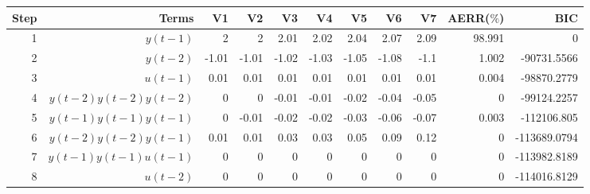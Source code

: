 \begin{tabular}{rrrrrrrrrrr}
Step & Terms & V1 & V2 & V3 & V4 & V5 & V6 & V7 & AERR($\%$) & BIC \\ 
\hline 
1 & $y(t-1)$ & 2 & 2 & 2.01 & 2.02 & 2.04 & 2.07 & 2.09 & 98.991 & 0 \\ 
2 & $y(t-2)$ & -1.01 & -1.01 & -1.02 & -1.03 & -1.05 & -1.08 & -1.1 & 1.002 & -90731.5566 \\ 
3 & $u(t-1)$ & 0.01 & 0.01 & 0.01 & 0.01 & 0.01 & 0.01 & 0.01 & 0.004 & -98870.2779 \\ 
4 & $y(t-2)y(t-2)y(t-2)$ & 0 & 0 & -0.01 & -0.01 & -0.02 & -0.04 & -0.05 & 0 & -99124.2257 \\ 
5 & $y(t-1)y(t-1)y(t-1)$ & 0 & -0.01 & -0.02 & -0.02 & -0.03 & -0.06 & -0.07 & 0.003 & -112106.805 \\ 
6 & $y(t-2)y(t-2)y(t-1)$ & 0.01 & 0.01 & 0.03 & 0.03 & 0.05 & 0.09 & 0.12 & 0 & -113689.0794 \\ 
7 & $y(t-1)y(t-1)u(t-1)$ & 0 & 0 & 0 & 0 & 0 & 0 & 0 & 0 & -113982.8189 \\ 
8 & $u(t-2)$ & 0 & 0 & 0 & 0 & 0 & 0 & 0 & 0 & -114016.8129 \\ 
\hline 
\end{tabular}
